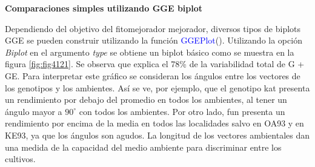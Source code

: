 \textbf{Comparaciones simples utilizando GGE biplot}

Dependiendo del objetivo del fitomejorador mejorador, diversos tipos de biplots GGE se pueden construir utilizando la función \textcolor{blue}{GGEPlot}(). Utilizando la opción \emph{Biplot} en el argumento \emph{type} se obtiene un biplot básico como se muestra en la figura \ref{fig:fig4121}. Se observa que explica el 78\% de la variabilidad total de G + GE. Para interpretar este gráfico se consideran los ángulos entre los vectores de los genotipos y los ambientes. Así se ve, por ejemplo, que el genotipo kat presenta un rendimiento por debajo del promedio en todos los ambientes, al tener un ángulo mayor a $90^{\circ}$ con todos los ambientes. Por otro lado, fun presenta un rendimiento por encima de la media en todos las localidades salvo en OA93 y en KE93, ya que los ángulos son agudos. La longitud de los vectores ambientales dan una medida de la capacidad del medio ambiente para discriminar entre los cultivos. 



